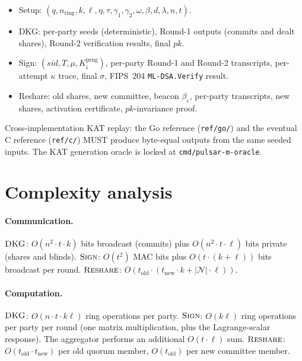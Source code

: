 \documentclass[11pt,a4paper]{article}
\theoremstyle{definition}
\theoremstyle{remark}
\newcommand{\Sign}{\textsc{Sign}}
\newcommand{\DKG}{\textsc{DKG}}
\newcommand{\Reshare}{\textsc{Reshare}}
\begin{document}
\begin{itemize}[leftmargin=*, itemsep=0pt]
\item Setup: $(q, n_{\mathrm{ring}}, k, \ell, \eta, \tau, \gamma_1, \gamma_2, \omega, \beta, d, \lambda, n, t)$.
\item DKG: per-party seeds (deterministic), Round-1 outputs (commits and dealt shares), Round-2 verification results, final $\mathit{pk}$.
\item Sign: $(\mathit{sid}, T, \mu, K_i^{\mathrm{prng}})$, per-party Round-1 and Round-2 transcripts, per-attempt $\kappa$ trace, final $\sigma$, FIPS~204 \texttt{ML-DSA.Verify} result.
\item Reshare: old shares, new committee, beacon $\beta_e$, per-party transcripts, new shares, activation certificate, $\mathit{pk}$-invariance proof.
\end{itemize}

Cross-implementation KAT replay: the Go reference (\texttt{ref/go/})
and the eventual C reference (\texttt{ref/c/}) MUST produce
byte-equal outputs from the same seeded inputs. The KAT generation
oracle is locked at \texttt{cmd/pulsar-m-oracle}.

\section{Complexity analysis}
\label{sec:complexity}

\paragraph{Communication.}
$\DKG$: $O(n^2 \cdot t \cdot k)$ bits broadcast (commits) plus
$O(n^2 \cdot t \cdot \ell)$ bits private (shares and blinds).
$\Sign$: $O(t^2)$ MAC bits plus $O(t \cdot (k + \ell))$ bits
broadcast per round. $\Reshare$: $O(t_{\mathrm{old}} \cdot
(t_{\mathrm{new}} \cdot k + |\mathcal{N}| \cdot \ell))$.

\paragraph{Computation.}
$\DKG$: $O(n \cdot t \cdot k\ell)$ ring operations per party.
$\Sign$: $O(k\ell)$ ring operations per party per round (one matrix
multiplication, plus the Lagrange-scalar response). The aggregator
performs an additional $O(t \cdot \ell)$ sum.
$\Reshare$: $O(t_{\mathrm{old}} \cdot t_{\mathrm{new}})$ per old quorum
member, $O(t_{\mathrm{old}})$ per new committee member.
\end{document}
